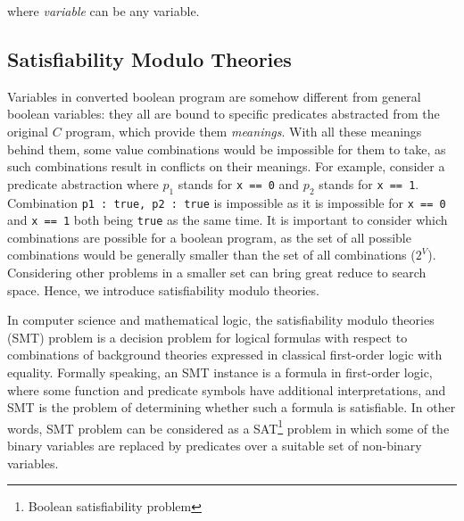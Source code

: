 where \textit{variable} can be any variable.

\subsection{Satisfiability Modulo Theories}
\label{section:SatisifiabilityModuloTheories}
Variables in converted boolean program are somehow different from general boolean variables: they all are bound to specific predicates abstracted from the original $C$ program, which provide them {\it meanings}.
With all these meanings behind them, some value combinations would be impossible for them to take, as such combinations result in conflicts on their meanings.
For example, consider a predicate abstraction where $p_{1}$ stands for \lstinline|x == 0| and $p_{2}$ stands for \lstinline|x == 1|.
Combination \lstinline|p1 : true, p2 : true| is impossible as it is impossible for \lstinline|x == 0| and \lstinline|x == 1| both being \lstinline|true| as the same time.
It is important to consider which combinations are possible for a boolean program, as the set of all possible combinations would be generally smaller than the set of all combinations ($2^{V}$).
Considering other problems in a smaller set can bring great reduce to search space.
Hence, we introduce satisfiability modulo theories.

In computer science and mathematical logic, the satisfiability modulo theories (SMT) problem\cite{SMT} is a decision problem for logical formulas with respect to combinations of background theories expressed in classical first-order logic with equality.
Formally speaking, an SMT instance is a formula in first-order logic, where some function and predicate symbols have additional interpretations, and SMT is the problem of determining whether such a formula is satisfiable.
In other words, SMT problem can be considered as a SAT\footnote{Boolean satisfiability problem} problem in which some of the binary variables are replaced by predicates over a suitable set of non-binary variables\cite{BSAT:SMT}.

